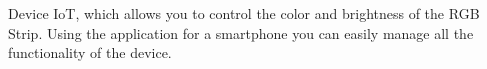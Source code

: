 Device IoT, which allows you to control the color and brightness of the R\+GB Strip. Using the application for a smartphone you can easily manage all the functionality of the device. 